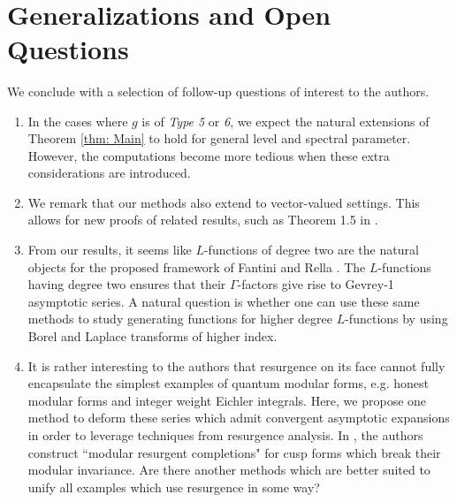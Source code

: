 \documentclass[12pt]{amsart}
\theoremstyle{definition}
\theoremstyle{plain}
\numberwithin{equation}{section}
\begin{document}
\



\section{Generalizations and Open Questions}\label{sec: questions}
We conclude with a selection of follow-up questions of interest to the authors. 

\begin{enumerate}
\item In the cases where $g$ is of \emph{Type 5} or \emph{6}, we expect the natural extensions of Theorem \ref{thm: Main} to hold for general level and spectral parameter. However, the computations become more tedious when these extra considerations are introduced. 
\item We remark that our methods also extend to vector-valued settings. This allows for new proofs of related results, such as Theorem 1.5 in \cite{bringmann-nazaroglu}. 
\item From our results, it seems like $L$-functions of degree two are the natural objects for the proposed framework of Fantini and Rella \cite{fantini-rella}. The $L$-functions having degree two ensures that their $\Gamma$-factors give rise to Gevrey-1 asymptotic series. A natural question is whether one can use these same methods to study generating functions for higher degree $L$-functions by using Borel and Laplace transforms of higher index. 
\item It is rather interesting to the authors that resurgence on its face cannot fully encapsulate the simplest examples of quantum modular forms, e.g. honest modular forms and integer weight Eichler integrals. Here, we propose one method to deform these series which admit convergent asymptotic expansions in order to leverage techniques from resurgence analysis. In \cite{fantini-rella}, the authors construct ``modular resurgent completions" for cusp forms which break their modular invariance. Are there another methods which are better suited to unify all examples which use resurgence in some way?
\end{enumerate}

{}

\end{document}
